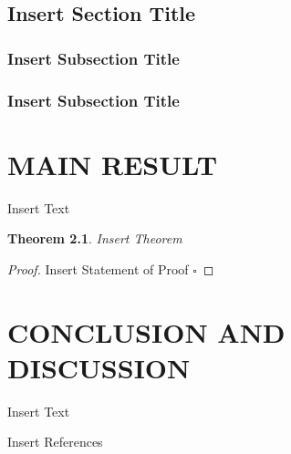 \documentclass[12pt,a4paper,oneside]{book}
\theoremstyle{plain}
\newtheorem{thm}{Theorem}[chapter]
\numberwithin{equation}{chapter} \DeclareMathOperator{\Var}{Var}
\newcommand*{\QEDAa}{\hfill\ensuremath{\square}}
\begin{document}
\section{Insert Section Title}\label{Sec3.2}
\subsection{Insert Subsection Title}\label{sub3.2.1}
\subsection{Insert Subsection Title}\label{sub3.2.2}

\chapter{MAIN RESULT}

Insert Text
 
 \begin{thm}\label{thmx}
 	Insert Theorem
 \end{thm}
 
 \noindent\begin{proof}
 	Insert Statement of Proof
 	\QEDAa
 \end{proof}

\chapter{CONCLUSION AND DISCUSSION}
Insert Text



\begin{thebibliography}{99}

Insert References
\end{thebibliography}
\end{document}

